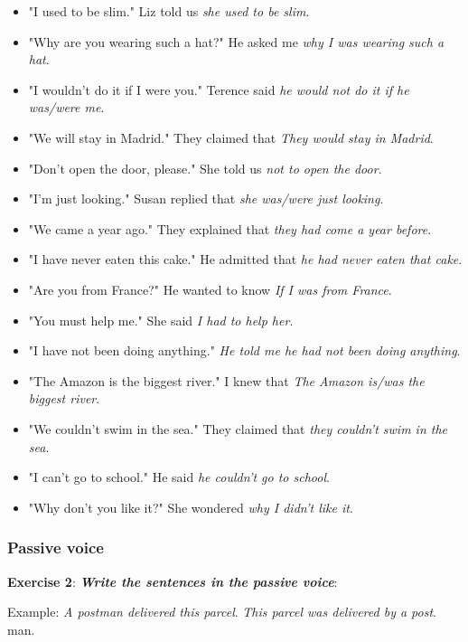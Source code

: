 \begin{itemize}

\item "I used to be slim." Liz told us \textit{she used to be slim}.
\item "Why are you wearing such a hat?" He asked me \textit{why I was wearing such a hat}.
\item "I wouldn't do it if I were you." Terence said \textit{he would not do it if he was/were 
me}.
\item "We will stay in Madrid." They claimed that \textit{They would stay in Madrid}.
\item "Don't open the door, please." She told us \textit{not to open the door}.
\item "I'm just looking." Susan replied that \textit{she was/were just looking}.
\item "We came a year ago." They explained that \textit{they had come a year before}.
\item "I have never eaten this cake." He admitted that \textit{he had never eaten that cake}.
\item "Are you from France?" He wanted to know \textit{If I was from France}.
\item "You must help me." She said \textit{I had to help her}.
\item "I have not been doing anything." \textit{He told me he had not been doing anything}.
\item "The Amazon is the biggest river." I knew that \textit{The Amazon is/was the biggest river}.
\item "We couldn't swim in the sea." They claimed that \textit{they couldn't swim in the sea}.
\item "I can't go to school." He said \textit{he couldn't go to school}.
\item "Why don't you like it?" She wondered \textit{why I didn't like it}.

\end{itemize}

\subsubsection{Passive voice}

\textbf{Exercise 2}: \textit{\textbf{Write the sentences in the passive voice}}:

Example:
\textit{A postman delivered this parcel}.
\textit{This parcel was delivered by a post}.
man.

